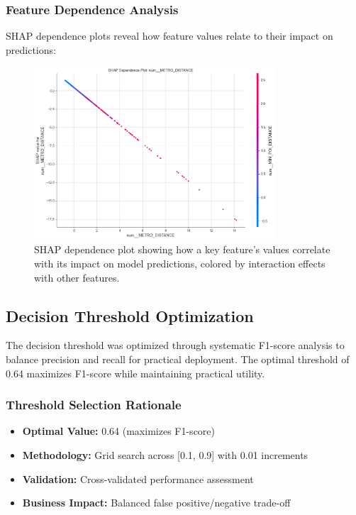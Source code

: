 \documentclass[11pt]{article}
\begin{document}
\subsubsection{Feature Dependence Analysis}
SHAP dependence plots reveal how feature values relate to their impact on predictions:

\begin{figure}[H]
\centering
\includegraphics[width=0.8\textwidth]{LogisticRegression_shap_dependence.png}
\caption{SHAP dependence plot showing how a key feature's values correlate with its impact on model predictions, colored by interaction effects with other features.}
\label{fig:shap_dependence}
\end{figure}

\subsection{Decision Threshold Optimization}
\label{sec:threshold}

The decision threshold was optimized through systematic F1-score analysis to balance precision and recall for practical deployment. The optimal threshold of 0.64 maximizes F1-score while maintaining practical utility.

\subsubsection{Threshold Selection Rationale}
\begin{itemize}[leftmargin=*]
\item \textbf{Optimal Value:} 0.64 (maximizes F1-score)
\item \textbf{Methodology:} Grid search across [0.1, 0.9] with 0.01 increments
\item \textbf{Validation:} Cross-validated performance assessment
\item \textbf{Business Impact:} Balanced false positive/negative trade-off
\end{itemize}
\end{document}
